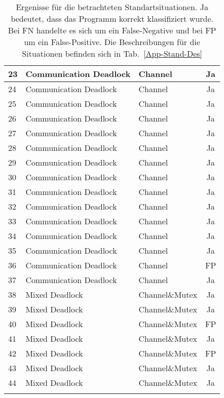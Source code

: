 \begin{longtable}[h]{|l|l|l|c|}
  23 & Communication Deadlock & Channel & Ja \\ \hline
  24 & Communication Deadlock & Channel & Ja \\ \hline
  25 & Communication Deadlock & Channel & Ja \\ \hline
  26 & Communication Deadlock & Channel & Ja \\ \hline
  27 & Communication Deadlock & Channel & Ja \\ \hline
  28 & Communication Deadlock & Channel & Ja \\ \hline
  29 & Communication Deadlock & Channel & Ja \\ \hline
  30 & Communication Deadlock & Channel & Ja \\ \hline
  31 & Communication Deadlock & Channel & Ja \\ \hline
  32 & Communication Deadlock & Channel & Ja \\ \hline
  33 & Communication Deadlock & Channel & Ja \\ \hline
  34 & Communication Deadlock & Channel & Ja \\ \hline
  35 & Communication Deadlock & Channel & Ja \\ \hline
  36 & Communication Deadlock & Channel & FP \\ \hline
  37 & Communication Deadlock & Channel & Ja \\ \hline
  38 & Mixed Deadlock & Channel\&Mutex & Ja \\ \hline
  39 & Mixed Deadlock & Channel\&Mutex & Ja \\ \hline
  40 & Mixed Deadlock & Channel\&Mutex & FP \\ \hline
  41 & Mixed Deadlock & Channel\&Mutex & Ja \\ \hline
  42 & Mixed Deadlock & Channel\&Mutex & FP \\ \hline
  43 & Mixed Deadlock & Channel\&Mutex & Ja \\ \hline
  44 & Mixed Deadlock & Channel\&Mutex & Ja \\ \hline
  \caption{Ergenisse für die betrachteten Standartsituationen. Ja bedeutet, 
  dass das Programm korrekt klassifiziert wurde. Bei FN handelte es sich 
  um ein False-Negative und bei FP um ein False-Positive. Die Beschreibungen
  für die Situationen befinden sich in Tab.~\ref{App-Stand-Des}}
  \label{App-Stand-Res}
\end{longtable}



